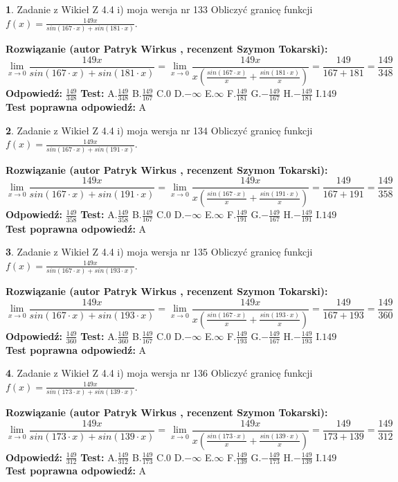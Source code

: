 \documentclass[12pt, a4paper]{article}
\theoremstyle{definition} %
\newtheorem{zad}{}
\newcommand{\zadStart}[1]{\begin{zad}#1\newline}
\newcommand{\zadStop}{\end{zad}}
\newcommand{\rozwStart}[2]{\noindent \textbf{Rozwiązanie (autor #1 , recenzent #2): }\newline}
\newcommand{\rozwStop}{\newline}
\newcommand{\odpStart}{\noindent \textbf{Odpowiedź:}\newline}
\newcommand{\odpStop}{\newline}
\newcommand{\testStart}{\noindent \textbf{Test:}\newline}
\newcommand{\testStop}{\newline}
\newcommand{\kluczStart}{\noindent \textbf{Test poprawna odpowiedź:}\newline}
\newcommand{\kluczStop}{\newline}
\begin{document}
\zadStart{Zadanie z Wikieł Z 4.4 i) moja wersja nr 133}
Obliczyć granicę funkcji $f(x)=\frac{149x}{sin(167\cdot x) +sin(181\cdot x)}$.
\zadStop
\rozwStart{Patryk Wirkus}{Szymon Tokarski}
$$\lim\limits_{x\to 0}\frac{149x}{sin(167\cdot x) +sin(181\cdot x)}=\lim\limits_{x\to 0}\frac{149x}{x(\frac{sin(167\cdot x)}{x}+\frac{sin(181\cdot x)}{x})}=\frac{149}{167+181} = \frac{149}{348}$$
\rozwStop
\odpStart
$\frac{149}{348}$
\odpStop
\testStart
A.$\frac{149}{348}$
B.$\frac{149}{167}$
C.$0$
D.$-\infty$
E.$\infty$
F.$\frac{149}{181}$
G.$-\frac{149}{167}$
H.$-\frac{149}{181}$
I.$149$
\testStop
\kluczStart
A
\kluczStop



\zadStart{Zadanie z Wikieł Z 4.4 i) moja wersja nr 134}
Obliczyć granicę funkcji $f(x)=\frac{149x}{sin(167\cdot x) +sin(191\cdot x)}$.
\zadStop
\rozwStart{Patryk Wirkus}{Szymon Tokarski}
$$\lim\limits_{x\to 0}\frac{149x}{sin(167\cdot x) +sin(191\cdot x)}=\lim\limits_{x\to 0}\frac{149x}{x(\frac{sin(167\cdot x)}{x}+\frac{sin(191\cdot x)}{x})}=\frac{149}{167+191} = \frac{149}{358}$$
\rozwStop
\odpStart
$\frac{149}{358}$
\odpStop
\testStart
A.$\frac{149}{358}$
B.$\frac{149}{167}$
C.$0$
D.$-\infty$
E.$\infty$
F.$\frac{149}{191}$
G.$-\frac{149}{167}$
H.$-\frac{149}{191}$
I.$149$
\testStop
\kluczStart
A
\kluczStop



\zadStart{Zadanie z Wikieł Z 4.4 i) moja wersja nr 135}
Obliczyć granicę funkcji $f(x)=\frac{149x}{sin(167\cdot x) +sin(193\cdot x)}$.
\zadStop
\rozwStart{Patryk Wirkus}{Szymon Tokarski}
$$\lim\limits_{x\to 0}\frac{149x}{sin(167\cdot x) +sin(193\cdot x)}=\lim\limits_{x\to 0}\frac{149x}{x(\frac{sin(167\cdot x)}{x}+\frac{sin(193\cdot x)}{x})}=\frac{149}{167+193} = \frac{149}{360}$$
\rozwStop
\odpStart
$\frac{149}{360}$
\odpStop
\testStart
A.$\frac{149}{360}$
B.$\frac{149}{167}$
C.$0$
D.$-\infty$
E.$\infty$
F.$\frac{149}{193}$
G.$-\frac{149}{167}$
H.$-\frac{149}{193}$
I.$149$
\testStop
\kluczStart
A
\kluczStop



\zadStart{Zadanie z Wikieł Z 4.4 i) moja wersja nr 136}
Obliczyć granicę funkcji $f(x)=\frac{149x}{sin(173\cdot x) +sin(139\cdot x)}$.
\zadStop
\rozwStart{Patryk Wirkus}{Szymon Tokarski}
$$\lim\limits_{x\to 0}\frac{149x}{sin(173\cdot x) +sin(139\cdot x)}=\lim\limits_{x\to 0}\frac{149x}{x(\frac{sin(173\cdot x)}{x}+\frac{sin(139\cdot x)}{x})}=\frac{149}{173+139} = \frac{149}{312}$$
\rozwStop
\odpStart
$\frac{149}{312}$
\odpStop
\testStart
A.$\frac{149}{312}$
B.$\frac{149}{173}$
C.$0$
D.$-\infty$
E.$\infty$
F.$\frac{149}{139}$
G.$-\frac{149}{173}$
H.$-\frac{149}{139}$
I.$149$
\testStop
\kluczStart
A
\kluczStop
\end{document}

